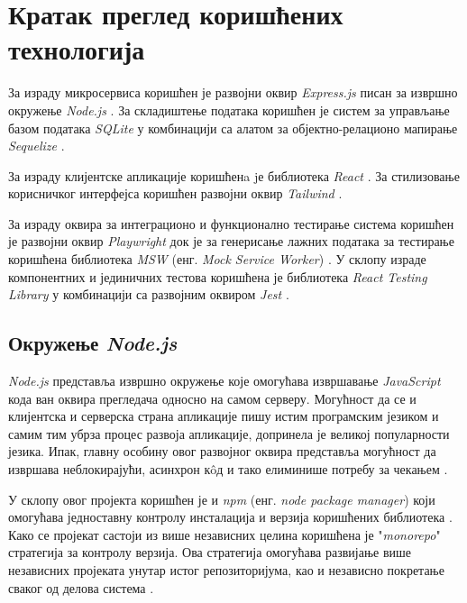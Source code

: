 \documentclass[12pt,oneside]{memoir}
\begin{document}
\section{Кратак преглед коришћених технологија}
\label{chp:tehnologije}

За израду микросервиса коришћен је развојни оквир \textit{Express.js} \cite{express} писан за извршно окружење \textit{Node.js} \cite{nodejs}. За складиштење података коришћен је систем за управљање базом података \textit{SQLite} \cite{sqlite} у комбинацији са алатом за објектно-релационо мапирање \textit{Sequelize} \cite{sequelize}. 

За израду клијентске апликације коришћенa jе библиотека \textit{React} \cite{react}. За стилизовање корисничког интерфејса коришћен развојни оквир \textit{Tailwind} \cite{tailwind}. 

За израду оквира за интеграционо и функционално тестирање система коришћен је развојни оквир \textit{Playwright} \cite{playwright} док је за генерисање лажних података за тестирање коришћена библиотека \textit{MSW} (енг. \textit{Mock Service Worker}) \cite{msw}. У склопу израде компонентних и јединичних тестова коришћена је библиотека \textit{React Testing Library} \cite{rtl} у комбинацији са развојним оквиром \textit{Jest} \cite{jest}.

\subsection{Окружење \textit{Node.js}}

\textit{Node.js} представља извршно окружење које омогућава извршавање \newline \textit{JavaScript} кода ван оквира прегледача односно на самом серверу. Могућност да се и клијентска и серверска страна апликације пишу истим програмским језиком и самим тим убрза процес развоја апликације, допринела је великој популарности језика.
Ипак, главну особину овог развојног оквира представља могућност да извршава неблокирајући, асинхрон к\^{o}д и тако елиминише потребу за чекањем  \cite{w3nodejs}.

У склопу овог пројекта коришћен је и \textit{npm} (енг. \textit{node package manager}) који омогућава једноставну контролу инсталација и верзија коришћених библиотека \cite{npm}. Како се пројекат састоји из више независних целина коришћена је "\textit{monorepo}" стратегија за контролу верзија. Ова стратегија омогућава развијање више независних пројеката унутар истог репозиторијума, као и независно покретање сваког од делова система \cite{monorepo}.
\end{document}
